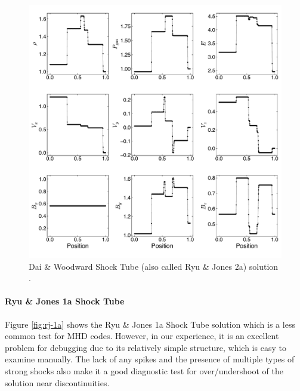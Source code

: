 \documentclass[modern, linenumbers]{aastex631}
\newcommand*{\img}[1]{%
    \raisebox{-.05\baselineskip}{%
        \texttt{[image: \#1]}%
    }%
}
\begin{document}
\begin{figure}[ht!]
    \includegraphics[width=\linewidth]{d-and-w.pdf}
    \caption{Dai \& Woodward Shock Tube (also called Ryu \& Jones 2a) solution \citep{dai_woodward_1998, ryu_jones_1995}.
    \href{https://zenodo.org/records/10927223}{\img{zenodo-gradient-200.png}}}
    \label{fig:dai-and-woodward}
\end{figure}

\paragraph{Ryu \& Jones 1a Shock Tube}
Figure \ref{fig:rj-1a} shows the Ryu \& Jones 1a Shock Tube solution \citep{ryu_jones_1995} which is a less common test for MHD codes. However, in our experience, it is an excellent problem for debugging due to its relatively simple structure, which is easy to examine manually. The lack of any spikes and the presence of multiple types of strong shocks also make it a good diagnostic test for over/undershoot of the solution near discontinuities.
\end{document}
